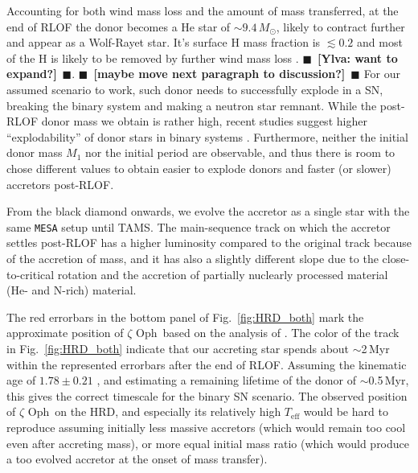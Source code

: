 \documentclass[twocolumn,twocolappendix,trackchanges]{aastex63}
\DeclareRobustCommand{\Figref}[1]{Fig.~\ref{#1}}
\newcommand{\zoph}{$\zeta$ Oph}
\newcommand{\todo}[1]{{\large $\blacksquare$~\textbf{\color{red}[#1]}}~$\blacksquare$}
\begin{document}
Accounting for both wind mass loss and the amount of mass transferred, at the end of RLOF the donor becomes a He star of
$\sim$$9.4\,M_\odot$, likely to contract further and appear as a
Wolf-Rayet star. It's surface H mass fraction is $\lesssim 0.2$ and
most of the H is likely to be removed by further wind mass loss
\citep[e.g.,][]{gotberg:17}. \todo{Ylva: want to expand?}.
\todo{maybe move next paragraph to discussion?} For our assumed
scenario to work, such donor needs to successfully explode in a SN,
breaking the binary system and making a neutron star remnant. While
the post-RLOF donor mass we obtain is rather high, recent studies
suggest higher ``explodability'' of donor stars in binary systems
\citep[e.g.,][]{schneider:21, laplace:21, vartanyan:21}. Furthermore,
neither the initial donor mass $M_1$ nor the initial period are observable,
and thus there is room to chose different values to obtain easier to
explode donors and faster (or slower) accretors post-RLOF.

From the black diamond onwards, we evolve the accretor as a single star with the same \texttt{MESA} setup until TAMS. The main-sequence track on which the accretor settles post-RLOF has a higher luminosity compared to the original track because of the accretion of mass, and it has also a slightly different slope due to the close-to-critical rotation and the accretion of partially nuclearly processed material (He- and N-rich) material.

The red errorbars in the bottom panel of \Figref{fig:HRD_both} mark the approximate position of \zoph\ based on the analysis of . The color of the track in \Figref{fig:HRD_both} indicate that our accreting star spends about
$\sim$2\,Myr within the represented errorbars after the end of RLOF. Assuming the kinematic age of
$1.78\pm0.21$ \citep{neuhauser:20}, and estimating a remaining lifetime of the donor of
$\sim$0.5\,Myr, this gives the correct timescale for the binary SN scenario.
The observed position of \zoph\ on the HRD, and especially
its relatively high $T_\mathrm{eff}$ would be hard to reproduce
assuming initially less massive accretors (which would remain too cool
even after accreting mass), or more equal initial mass ratio (which
would produce a too evolved accretor at the onset of mass transfer).
\end{document}
